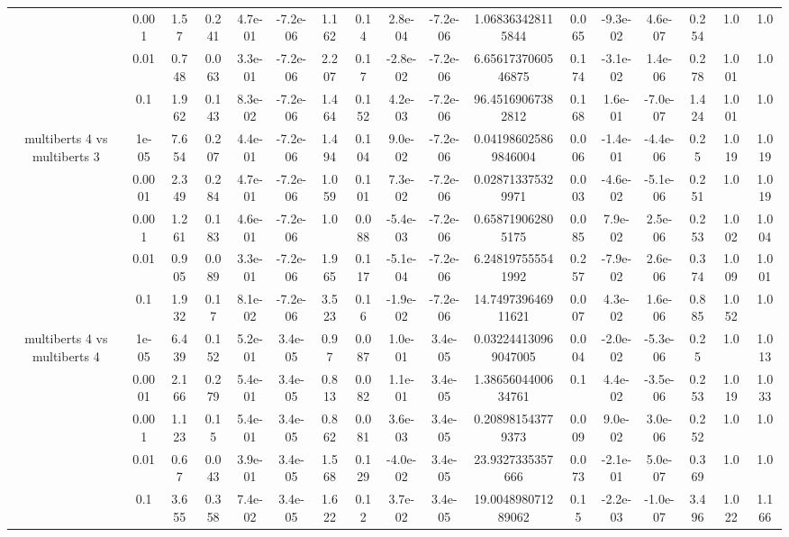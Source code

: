 \begin{tabular}{|c|c|c|c|c|c|c|c|c|c|c|c|c|c|c|c|c|}
 & 0.001 & 1.57 & 0.241 & 4.7e-01 & -7.2e-06 & 1.162 & 0.14 & 2.8e-04 & -7.2e-06 & 1.068363428115844 & 0.065 & -9.3e-02 & 4.6e-07 & 0.254 & 1.0 & 1.0 \\
 & 0.01 & 0.748 & 0.063 & 3.3e-01 & -7.2e-06 & 2.207 & 0.17 & -2.8e-02 & -7.2e-06 & 6.6561737060546875 & 0.174 & -3.1e-02 & 1.4e-06 & 0.278 & 1.001 & 1.0 \\
 & 0.1 & 1.962 & 0.143 & 8.3e-02 & -7.2e-06 & 1.464 & 0.152 & 4.2e-03 & -7.2e-06 & 96.45169067382812 & 0.168 & 1.6e-01 & -7.0e-07 & 1.424 & 1.001 & 1.0 \\
\hline
\multirow{5}{*}{multiberts 4 vs multiberts 3} & 1e-05 & 7.654 & 0.207 & 4.4e-01 & -7.2e-06 & 1.494 & 0.104 & 9.0e-02 & -7.2e-06 & 0.041986025869846004 & 0.006 & -1.4e-01 & -4.4e-06 & 0.25 & 1.019 & 1.019 \\
 & 0.0001 & 2.349 & 0.284 & 4.7e-01 & -7.2e-06 & 1.059 & 0.101 & 7.3e-02 & -7.2e-06 & 0.028713375329971 & 0.003 & -4.6e-02 & -5.1e-06 & 0.251 & 1.0 & 1.019 \\
 & 0.001 & 1.261 & 0.183 & 4.6e-01 & -7.2e-06 & 1.0 & 0.088 & -5.4e-03 & -7.2e-06 & 0.658719062805175 & 0.085 & 7.9e-02 & 2.5e-06 & 0.253 & 1.002 & 1.004 \\
 & 0.01 & 0.905 & 0.089 & 3.3e-01 & -7.2e-06 & 1.965 & 0.117 & -5.1e-04 & -7.2e-06 & 6.248197555541992 & 0.257 & -7.9e-02 & 2.6e-06 & 0.374 & 1.009 & 1.001 \\
 & 0.1 & 1.932 & 0.17 & 8.1e-02 & -7.2e-06 & 3.523 & 0.16 & -1.9e-02 & -7.2e-06 & 14.749739646911621 & 0.007 & 4.3e-02 & 1.6e-06 & 0.885 & 1.052 & 1.0 \\
\hline
\multirow{5}{*}{multiberts 4 vs multiberts 4} & 1e-05 & 6.439 & 0.152 & 5.2e-01 & 3.4e-05 & 0.97 & 0.087 & 1.0e-01 & 3.4e-05 & 0.032244130969047005 & 0.004 & -2.0e-02 & -5.3e-06 & 0.25 & 1.0 & 1.013 \\
 & 0.0001 & 2.166 & 0.279 & 5.4e-01 & 3.4e-05 & 0.813 & 0.082 & 1.1e-01 & 3.4e-05 & 1.3865604400634761 & 0.1 & 4.4e-02 & -3.5e-06 & 0.253 & 1.019 & 1.033 \\
 & 0.001 & 1.123 & 0.15 & 5.4e-01 & 3.4e-05 & 0.862 & 0.081 & 3.6e-03 & 3.4e-05 & 0.208981543779373 & 0.009 & 9.0e-02 & 3.0e-06 & 0.252 & 1.0 & 1.0 \\
 & 0.01 & 0.67 & 0.043 & 3.9e-01 & 3.4e-05 & 1.568 & 0.129 & -4.0e-02 & 3.4e-05 & 23.9327335357666 & 0.073 & -2.1e-01 & 5.0e-07 & 0.369 & 1.0 & 1.0 \\
 & 0.1 & 3.655 & 0.358 & 7.4e-02 & 3.4e-05 & 1.622 & 0.12 & 3.7e-02 & 3.4e-05 & 19.004898071289062 & 0.15 & -2.2e-03 & -1.0e-07 & 3.496 & 1.022 & 1.166 \\

\end{tabular}
